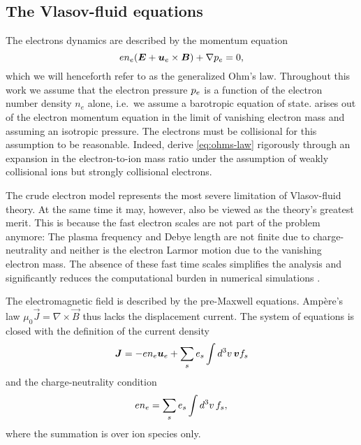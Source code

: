 \documentclass[aps,pre,notitlepage,amsmath,amssymb,amsfonts,nobibnotes,nofootinbib]{revtex4-1}
\begin{document}
\subsection{The Vlasov-fluid equations}

The electrons dynamics are described by the momentum equation
\begin{equation}
  \label{eq:ohms-law}
  e n_e(\vec{E} + \ue\times\vec{B}) + \nabla\pe = 0,
\end{equation}
which we will henceforth refer to as the generalized Ohm's law. Throughout
this work we assume that the electron pressure $p_e$ is a function of the
electron number density $n_e$ alone, i.e.\ we assume a barotropic equation of
state.  arises out of the electron momentum equation in the
limit of vanishing electron mass and assuming an isotropic pressure. The
electrons must be collisional for this assumption to be reasonable. Indeed,
\citet{Rosin2011} derive \cref{eq:ohms-law} rigorously through an expansion in
the electron-to-ion mass ratio under the assumption of weakly collisional ions
but strongly collisional electrons.

The crude electron model represents the most severe limitation of Vlasov-fluid
theory. At the same time it may, however, also be viewed as the theory's
greatest merit. This is because the fast electron scales are not part of the
problem anymore: The plasma frequency and Debye length are not finite due to
charge-neutrality and neither is the electron Larmor motion due to the
vanishing electron mass. The absence of these fast time scales simplifies the
analysis and significantly reduces the computational burden in numerical
simulations \citep{Byers1978,Winske2003,Kunz2014}.

The electromagnetic field is described by the pre-Maxwell equations. Ampère's
law $\mu_0\vec{J}=\nabla\times\vec{B}$ thus lacks the displacement current.
The system of equations is closed with the definition of the current density
\begin{equation}
  \label{eq:current}
  \vec{J} = -en_e\vec{u}_e + \sums \qs\int d^3v\,\vec{v} f_s%
\end{equation}
and the charge-neutrality condition
\begin{equation}
  \label{eq:charge-neutrality}
   en_e = \sums \qs\int d^3v\,f_s,
\end{equation}
where the summation is over ion species only.
\end{document}
